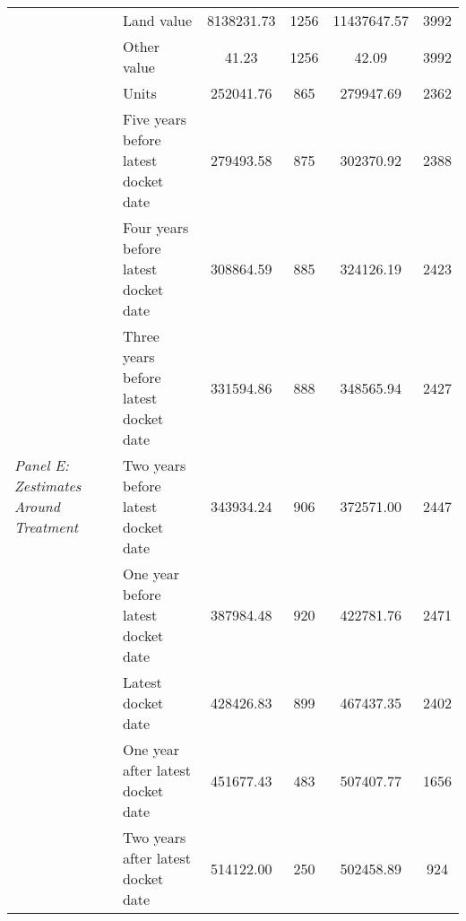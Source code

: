 \begin{tabular}{llcccc}
 & Land value & 8138231.73 & 1256 & 11437647.57 & 3992 \\
 & Other value & 41.23 & 1256 & 42.09 & 3992 \\
\cline{1-6}
\multirow[c]{9}{4cm}{\textit{Panel E: Zestimates Around Treatment}} & Units & 252041.76 & 865 & 279947.69 & 2362 \\
 & Five years before latest docket date & 279493.58 & 875 & 302370.92 & 2388 \\
 & Four years before latest docket date & 308864.59 & 885 & 324126.19 & 2423 \\
 & Three years before latest docket date & 331594.86 & 888 & 348565.94 & 2427 \\
 & Two years before latest docket date & 343934.24 & 906 & 372571.00 & 2447 \\
 & One year before latest docket date & 387984.48 & 920 & 422781.76 & 2471 \\
 & Latest docket date & 428426.83 & 899 & 467437.35 & 2402 \\
 & One year after latest docket date & 451677.43 & 483 & 507407.77 & 1656 \\
 & Two years after latest docket date & 514122.00 & 250 & 502458.89 & 924 \\
\cline{1-6}
\bottomrule
\end{tabular}
